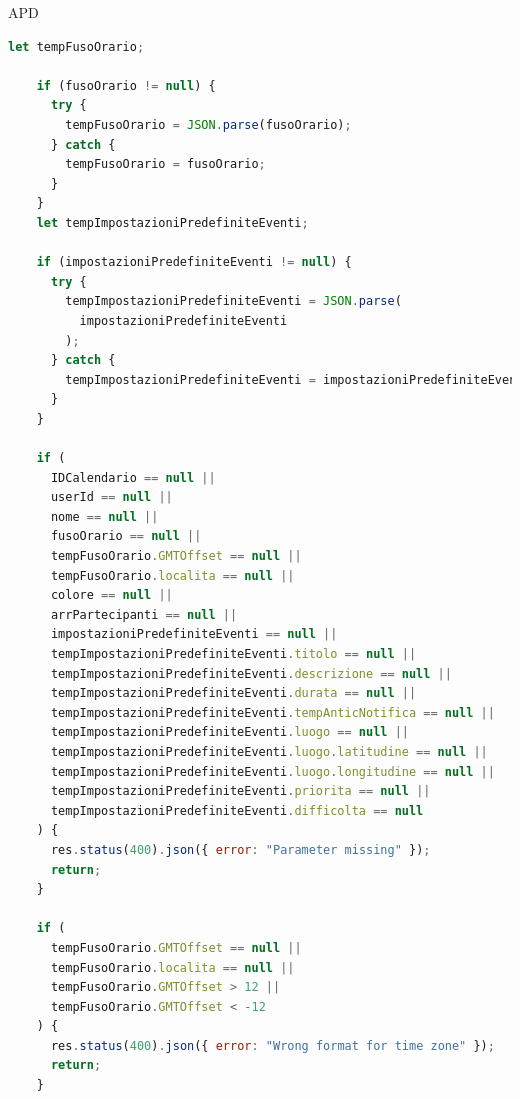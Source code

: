 \begin{listaPersonale} {APD}
\begin{listaPersonale2}[APD]{}
\begin{lstlisting}[language=JavaScript]
    let tempFusoOrario;

    if (fusoOrario != null) {
      try {
        tempFusoOrario = JSON.parse(fusoOrario);
      } catch {
        tempFusoOrario = fusoOrario;
      }
    }
    let tempImpostazioniPredefiniteEventi;

    if (impostazioniPredefiniteEventi != null) {
      try {
        tempImpostazioniPredefiniteEventi = JSON.parse(
          impostazioniPredefiniteEventi
        );
      } catch {
        tempImpostazioniPredefiniteEventi = impostazioniPredefiniteEventi;
      }
    }

    if (
      IDCalendario == null ||
      userId == null ||
      nome == null ||
      fusoOrario == null ||
      tempFusoOrario.GMTOffset == null ||
      tempFusoOrario.localita == null ||
      colore == null ||
      arrPartecipanti == null ||
      impostazioniPredefiniteEventi == null ||
      tempImpostazioniPredefiniteEventi.titolo == null ||
      tempImpostazioniPredefiniteEventi.descrizione == null ||
      tempImpostazioniPredefiniteEventi.durata == null ||
      tempImpostazioniPredefiniteEventi.tempAnticNotifica == null ||
      tempImpostazioniPredefiniteEventi.luogo == null ||
      tempImpostazioniPredefiniteEventi.luogo.latitudine == null ||
      tempImpostazioniPredefiniteEventi.luogo.longitudine == null ||
      tempImpostazioniPredefiniteEventi.priorita == null ||
      tempImpostazioniPredefiniteEventi.difficolta == null
    ) {
      res.status(400).json({ error: "Parameter missing" });
      return;
    }

    if (
      tempFusoOrario.GMTOffset == null ||
      tempFusoOrario.localita == null ||
      tempFusoOrario.GMTOffset > 12 ||
      tempFusoOrario.GMTOffset < -12
    ) {
      res.status(400).json({ error: "Wrong format for time zone" });
      return;
    }


\end{lstlisting}
\end{listaPersonale2}
\end{listaPersonale}
